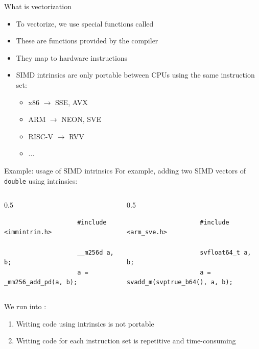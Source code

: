 \documentclass[
    aspectratio=169,
    \createHandout
]{beamer}
\begin{document}
\begin{frame}[fragile]{What is vectorization}
    \begin{itemize}
        \item To vectorize, we use special functions called 
        \item These are functions provided by the compiler
        \item They map to hardware instructions
        \item SIMD intrinsics are only portable between CPUs using the same instruction set:
        \begin{itemize}
            \item x86 $\rightarrow$ SSE, AVX
            \item ARM $\rightarrow$ NEON, SVE
            \item RISC-V $\rightarrow$ RVV
            \item ...
        \end{itemize}
    \end{itemize}
\end{frame}

\begin{frame}[fragile]{Example: usage of SIMD intrinsics}
    For example, adding two SIMD vectors of \texttt{double} using intrinsics:
    \begin{columns}
        \begin{column}{0.5\linewidth}
            \begin{center}
                \caption{Using AVX2 (Intel, AMD CPUs)}
                \begin{verbatim}
                    #include <immintrin.h>

                    __m256d a, b;
                    a = _mm256_add_pd(a, b);
                \end{verbatim}
            \end{center}
        \end{column}
        \begin{column}{0.5\linewidth}
            \begin{center}
                \caption{Using SVE (ARM CPUs)}
                \begin{verbatim}
                    #include <arm_sve.h>

                    svfloat64_t a, b;
                    a = svadd_m(svptrue_b64(), a, b);
                \end{verbatim}
            \end{center}
        \end{column}
    \end{columns}

    \vspace{10pt}

    We run into :
    \begin{enumerate}
        \item Writing code using intrinsics is not portable
        \item Writing code for each instruction set is repetitive and time-consuming
    \end{enumerate}
\end{frame}
\end{document}
